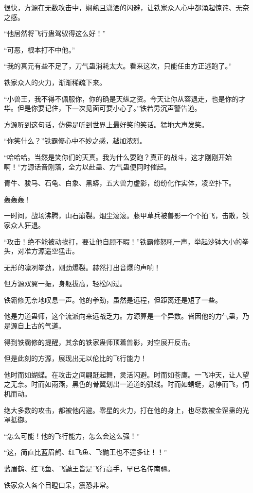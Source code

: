 \begin{this_body}
很快，方源在无数攻击中，娴熟且潇洒的闪避，让铁家众人心中都涌起惊诧、无奈之感。

“他居然将飞行蛊驾驭得这么好！”

“可恶，根本打不中他。”

“我的真元有些不足了，刀气蛊消耗太大。看来这次，只能任由方正逃跑了。”

铁家众人的火力，渐渐稀疏下来。

“小兽王，我不得不佩服你，你的确是天纵之资。今天让你从容退走，也是你的才华。但是你要记住，下一次见面可要小心了。”铁若男沉声警告道。

方源听到这句话，仿佛是听到世界上最好笑的笑话。猛地大声发笑。

“你笑什么？”铁霸修心中不妙之感，越加浓烈。

“哈哈哈。当然是笑你们的天真。我为什么要跑？真正的战斗，这才刚刚开始啊！”方源话音刚落，全力以赴蛊、力气蛊便同时催起。

青牛、骏马、石龟、白象、黑蟒，五大兽力虚影，纷纷化作实体，凌空扑下。

轰轰轰！

一时间，战场沸腾，山石崩裂。烟尘滚滚。藤甲草兵被兽影一个个拍飞，击散，铁家众人狂退。

“攻击！绝不能被动挨打，要让他自顾不暇！”铁霸修怒吼一声，举起沙钵大小的拳头，对准方源遥空猛击。

无形的凛冽拳劲，刚劲爆裂。赫然打出音爆的声响！

但方源双翼一振，身躯拔高，轻松闪过。

铁霸修无奈地叹息一声。他的拳劲，虽然是远程，但距离还是短了一些。

他是力道蛊师，这个流派向来远战乏力。方源算是一个异数。皆因他的力气蛊，乃是源自上古的气道。

得到铁霸修的提醒，其余的铁家蛊师顶着兽影，对空展开反击。

但是此刻的方源，展现出无以伦比的飞行能力！

他时而如蝴蝶。在攻击之间翩跹起舞，灵活闪避。时而如苍鹰。一飞冲天，让人望之无奈。时而如雨燕，黑色的骨翼划出一道道的弧线。时而如蜻蜓，悬停而飞，伺机而动。

绝大多数的攻击，都被他闪避。零星的火力，打在他的身上，也尽数被金罡蛊的光罩抵御。

“怎么可能！他的飞行能力，怎么会这么强！”

“这，简直比蓝眉鹤、红飞鱼、飞鼬王也不遑多让！！”

蓝眉鹤、红飞鱼、飞鼬王皆是飞行高手，早已名传南疆。

铁家众人各个目瞪口呆，震恐非常。


\end{this_body}
